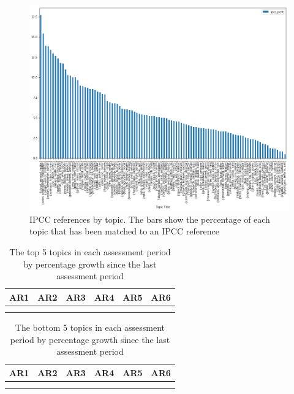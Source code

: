 \documentclass{article}
\begin{document}
\begin{figure}
	\includegraphics[width=\linewidth]{plots/ipcc_topics}
    \caption{IPCC references by topic. The bars show the percentage of each topic that has been matched to an IPCC reference}
    \label{IPCC}
\end{figure}

\begin{table}
\small
\setlength\tabcolsep{0.1cm}
\begin{tabular}{cccccc}
AR1 & AR2 & AR3 & AR4 & AR5 & AR6 \\
\midrule \\
 &   & 
 &   &   & 
\end{tabular}
\caption{The top 5 topics in each assessment period by percentage growth since the last assessment period}
\end{table}

\begin{table}
\small
\setlength\tabcolsep{0.1cm}
\begin{tabular}{cccccc}
AR1 & AR2 & AR3 & AR4 & AR5 & AR6 \\
\midrule \\
 &   & 
 &   &   & 
\end{tabular}
\caption{The bottom 5 topics in each assessment period by percentage growth since the last assessment period}
\end{table}
\end{document}
